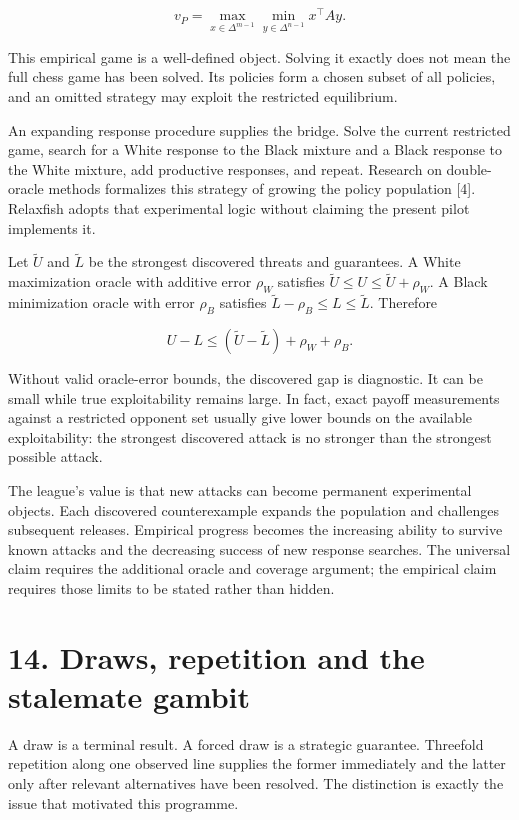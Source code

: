 \documentclass[10pt]{article}
\begin{document}
\[
v_P=\max_{x\in\Delta^{m-1}}\min_{y\in\Delta^{n-1}}x^\top Ay.
\]

This empirical game is a well-defined object. Solving it exactly does not mean the full chess game has been solved. Its policies form a chosen subset of all policies, and an omitted strategy may exploit the restricted equilibrium.

An expanding response procedure supplies the bridge. Solve the current restricted game, search for a White response to the Black mixture and a Black response to the White mixture, add productive responses, and repeat. Research on double-oracle methods formalizes this strategy of growing the policy population [4]. Relaxfish adopts that experimental logic without claiming the present pilot implements it.

Let $\widetilde U$ and $\widetilde L$ be the strongest discovered threats and guarantees. A White maximization oracle with additive error $\rho_W$ satisfies $\widetilde U\le U\le\widetilde U+\rho_W$. A Black minimization oracle with error $\rho_B$ satisfies $\widetilde L-\rho_B\le L\le\widetilde L$. Therefore

\[
U-L\le(\widetilde U-\widetilde L)+\rho_W+\rho_B.
\]

Without valid oracle-error bounds, the discovered gap is diagnostic. It can be small while true exploitability remains large. In fact, exact payoff measurements against a restricted opponent set usually give lower bounds on the available exploitability: the strongest discovered attack is no stronger than the strongest possible attack.

The league's value is that new attacks can become permanent experimental objects. Each discovered counterexample expands the population and challenges subsequent releases. Empirical progress becomes the increasing ability to survive known attacks and the decreasing success of new response searches. The universal claim requires the additional oracle and coverage argument; the empirical claim requires those limits to be stated rather than hidden.

\clearpage
\section*{14. Draws, repetition and the stalemate gambit}
A draw is a terminal result. A forced draw is a strategic guarantee. Threefold repetition along one observed line supplies the former immediately and the latter only after relevant alternatives have been resolved. The distinction is exactly the issue that motivated this programme.
\end{document}
